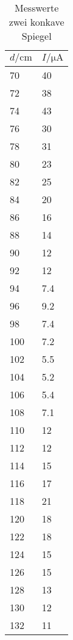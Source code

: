 \begin{table}[H]
  \centering
  \caption{Messwerte zwei konkave Spiegel}
  \label{tab:tabe1}
    \begin{tabular}{l l}
    \toprule
    $ d / \si{\centi\meter} $ & $ I / \si{\micro\ampere} $ \\
    \midrule
    70 & 40 \\
    72 & 38 \\
    74 & 43 \\
    76 & 30 \\
    78 & 31 \\
    80 & 23 \\
    82 & 25 \\
    84 & 20 \\
    86 & 16 \\
    88 & 14 \\
    90 & 12 \\
    92 & 12 \\
    94 & 7.4 \\
    96 & 9.2 \\
    98 & 7.4 \\
    100 & 7.2 \\
    102 & 5.5 \\
    104 & 5.2 \\
    106 & 5.4 \\
    108 & 7.1 \\
    110 & 12 \\
    112 & 12 \\
    114 & 15 \\
    116 & 17 \\
    118 & 21 \\
    120 & 18 \\
    122 & 18 \\
    124 & 15 \\
    126 & 15 \\
    128 & 13 \\
    130 & 12 \\
    132 & 11 \\



          \bottomrule
        \end{tabular}
    \end{table}
